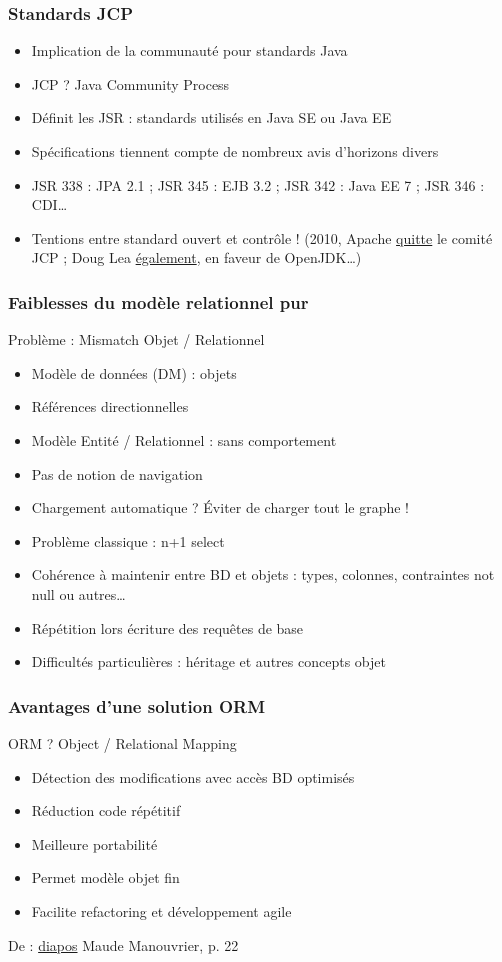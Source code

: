 \documentclass[english, french]{beamer}
\begin{document}
\begin{frame}
	\frametitle{Standards JCP}
	\begin{itemize}
		\item Implication de \og{}la communauté\fg{} pour standards Java
		\item JCP ? \pause Java Community Process \pause
		\item Définit les JSR : standards utilisés en Java SE ou Java EE
		\item Spécifications tiennent compte de nombreux avis d’horizons divers
		\item JSR 338 : JPA 2.1 ; JSR 345 : EJB 3.2 ; JSR 342 : Java EE 7 ; JSR 346 : CDI…
		\item Tentions entre standard ouvert et contrôle ! (2010, Apache \href{https://blogs.apache.org/foundation/entry/the_asf_resigns_from_the}{quitte} le comité JCP ; Doug Lea \href{http://gee.cs.oswego.edu/dl/html/jcp22oct10.html}{également}, en faveur de OpenJDK…)
	\end{itemize}
\end{frame}

\begin{frame}
	\frametitle{Faiblesses du modèle relationnel pur}
	Problème : \og{}Mismatch\fg{} Objet / Relationnel
	\begin{itemize}
		\item Modèle de données (DM) : objets
		\item Références directionnelles
		\item Modèle Entité / Relationnel : sans comportement
		\item Pas de notion de navigation
		\item Chargement automatique ? \pause Éviter de charger tout le graphe !\pause
		\item Problème classique : n+1 select
		\item Cohérence à maintenir entre BD et objets : types, colonnes, contraintes not null ou autres…
		\item Répétition lors écriture des requêtes de base
		\item Difficultés particulières : héritage et autres concepts objet
	\end{itemize}
\end{frame}

\begin{frame}
	\frametitle{Avantages d’une solution ORM}
	ORM ? \pause Object / Relational Mapping \pause
	\begin{itemize}
		\item Détection des modifications avec accès BD optimisés
		\item Réduction code répétitif
		\item Meilleure portabilité
		\item Permet modèle objet fin
		\item Facilite refactoring et développement agile
	\end{itemize}
	{\tiny De : \href{http://www.lamsade.dauphine.fr/~manouvri/HIBERNATE/SLIDES/ORM.pdf}{diapos} Maude Manouvrier, p. 22}
\end{frame}
\end{document}
